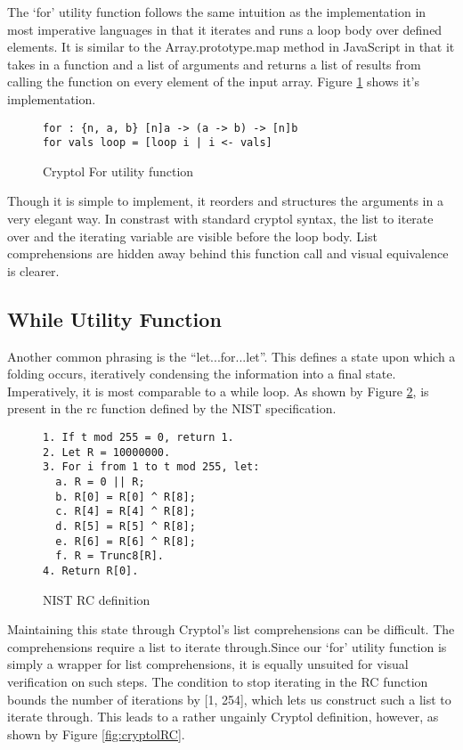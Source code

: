 The ‘for’ utility function follows the same intuition as the implementation in most 
imperative languages in that it iterates and runs a loop body over defined elements. 
It is similar to the Array.prototype.map method in JavaScript in that it takes in a 
function and a list of arguments and returns a list of results from calling the function 
on every element of the input array. Figure \ref{fig:cryptolFor} shows it's implementation.

\begin{figure}[h]
  \centering
\begin{lstlisting}[language=Cryptol]
for : {n, a, b} [n]a -> (a -> b) -> [n]b
for vals loop = [loop i | i <- vals]
\end{lstlisting}
\caption{Cryptol For utility function}
\label{fig:cryptolFor}
\end{figure}

Though it is simple to implement, it reorders and structures the arguments in a very elegant way.
In constrast with standard cryptol syntax, the list to iterate over and the iterating 
variable are visible before the loop body. List comprehensions are hidden away behind this 
function call and visual equivalence is clearer.

\subsection{While Utility Function}
Another common phrasing is the “let...for...let”. This defines a state upon which a folding 
occurs, iteratively condensing the information into a final state. Imperatively, it is most 
comparable to a while loop. As shown by Figure \ref{fig:nistRC}, is present in the rc function 
defined by the NIST specification.

\begin{figure}[h]
  \centering
\begin{lstlisting}[basewidth = {.5em},basicstyle={\scriptsize}]
1. If t mod 255 = 0, return 1.
2. Let R = 10000000.
3. For i from 1 to t mod 255, let:
  a. R = 0 || R;
  b. R[0] = R[0] ^ R[8];
  c. R[4] = R[4] ^ R[8];
  d. R[5] = R[5] ^ R[8];
  e. R[6] = R[6] ^ R[8];
  f. R = Trunc8[R].
4. Return R[0].
\end{lstlisting}
\caption{NIST RC definition}
\label{fig:nistRC}
\end{figure}

Maintaining this state through Cryptol's list comprehensions can be difficult.
The comprehensions require a list to iterate through.Since our ‘for’ utility 
function is simply a wrapper for list comprehensions, it is equally unsuited for 
visual verification on such steps. The condition to stop iterating in the RC function
bounds the number of iterations by [1, 254], which lets us construct such a list to 
iterate through. This leads to a rather ungainly Cryptol definition, however, as 
shown by Figure \ref{fig:cryptolRC}.

